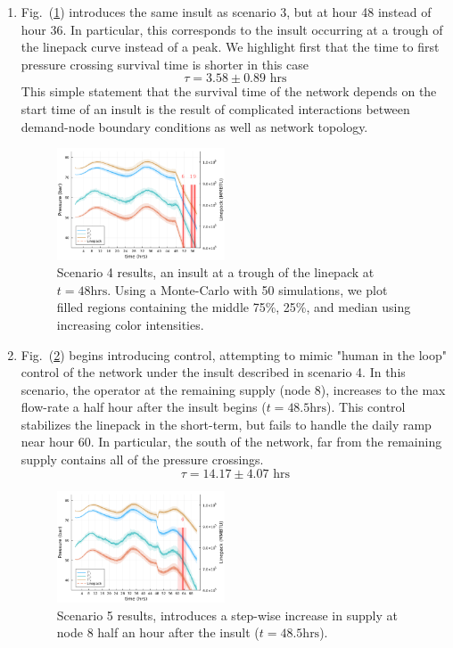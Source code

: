 \begin{enumerate}
    \item Fig.~(\ref{fig:scen4}) introduces the same insult as scenario 3, but at hour 48 instead of hour 36. In particular, this corresponds to the insult occurring at a trough of the linepack curve instead of a peak. We highlight first that the time to first pressure crossing survival time is shorter in this case
    \begin{equation}
        \tau = 3.58 \pm 0.89 \text{ hrs}
    \end{equation}
    This simple statement that the survival time of the network depends on the start time of an insult is the result of complicated interactions between demand-node boundary conditions as well as network topology.
\begin{figure}
    \centering
    \includegraphics[width=0.47\textwidth]{figs/ScenarioResults/scen4.png}
    \caption{Scenario 4 results, an insult at a trough of the linepack at $t=48\text{hrs}$. Using a Monte-Carlo with 50 simulations, we plot filled regions containing the middle 75\%, 25\%, and median using increasing color intensities.}
    \label{fig:scen4}
\end{figure}

    \item Fig.~(\ref{fig:scen5}) begins introducing control, attempting to mimic "human in the loop" control of the network under the insult described in scenario 4. In this scenario, the operator at the remaining supply (node 8), increases to the max flow-rate a half hour after the insult begins ($t=48.5\text{hrs}$). This control stabilizes the linepack in the short-term, but fails to handle the daily ramp near hour 60. In particular, the south of the network, far from the remaining supply contains all of the pressure crossings.
    \begin{equation}
        \tau = 14.17 \pm 4.07 \text{ hrs}
    \end{equation}
\begin{figure}
    \centering
    \includegraphics[width=0.47\textwidth]{figs/ScenarioResults/scen5.png}
    \caption{Scenario 5 results, introduces a step-wise increase in supply at node 8 half an hour after the insult ($t=48.5\text{hrs}$).}
    \label{fig:scen5}
\end{figure}


\end{enumerate}
